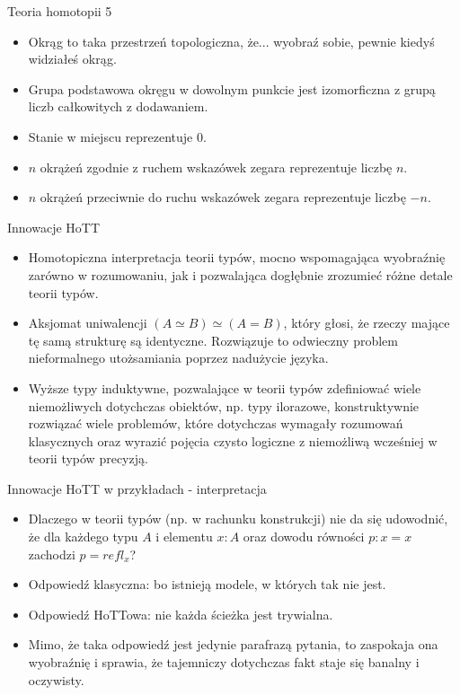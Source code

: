 \documentclass{beamer}
\begin{document}
\begin{frame}{Teoria homotopii 5}
\begin{itemize}
	\item Okrąg to taka przestrzeń topologiczna, że... wyobraź sobie, pewnie kiedyś widziałeś okrąg.
	\item Grupa podstawowa okręgu w dowolnym punkcie jest izomorficzna z grupą liczb całkowitych z dodawaniem.
	\item Stanie w miejscu reprezentuje $0$.
	\item $n$ okrążeń zgodnie z ruchem wskazówek zegara reprezentuje liczbę $n$.
	\item $n$ okrążeń przeciwnie do ruchu wskazówek zegara reprezentuje liczbę $-n$.
\end{itemize}
\end{frame}

\begin{frame}{Innowacje HoTT}
\begin{itemize}
	\item Homotopiczna interpretacja teorii typów, mocno wspomagająca wyobraźnię zarówno w rozumowaniu, jak i pozwalająca dogłębnie zrozumieć różne detale teorii typów.
	\item Aksjomat uniwalencji $(A \simeq B) \simeq (A = B)$, który głosi, że rzeczy mające tę samą strukturę są identyczne. Rozwiązuje to odwieczny problem nieformalnego utożsamiania poprzez nadużycie języka.
	\item Wyższe typy induktywne, pozwalające w teorii typów zdefiniować wiele niemożliwych dotychczas obiektów, np. typy ilorazowe, konstruktywnie rozwiązać wiele problemów, które dotychczas wymagały rozumowań klasycznych oraz wyrazić pojęcia czysto logiczne z niemożliwą wcześniej w teorii typów precyzją.
\end{itemize}
\end{frame}

\begin{frame}{Innowacje HoTT w przykładach - interpretacja}
\begin{itemize}
	\item Dlaczego w teorii typów (np. w rachunku konstrukcji) nie da się udowodnić, że dla każdego typu $A$ i elementu $x : A$ oraz dowodu równości $p : x = x$ zachodzi $p = refl_x$?
	\item Odpowiedź klasyczna: bo istnieją modele, w których tak nie jest.
	\item Odpowiedź HoTTowa: nie każda ścieżka jest trywialna.
	\item Mimo, że taka odpowiedź jest jedynie parafrazą pytania, to zaspokaja ona wyobraźnię i sprawia, że tajemniczy dotychczas fakt staje się banalny i oczywisty.
\end{itemize}
\end{frame}
\end{document}
